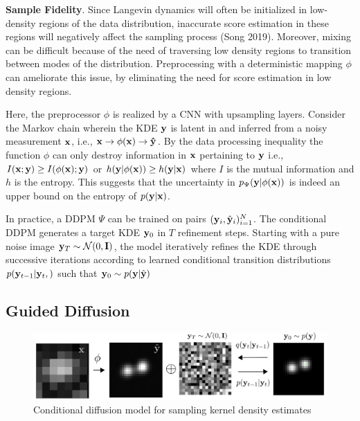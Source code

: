 \documentclass{article}
\begin{document}
\textbf{Sample Fidelity}. Since Langevin dynamics will often be initialized in low-density regions of the data distribution, inaccurate score estimation in these regions will negatively affect the sampling process (Song 2019). Moreover, mixing can be difficult because of the need of traversing low density regions to transition between modes of the distribution. Preprocessing with a deterministic mapping $\phi$ can ameliorate this issue, by eliminating the need for score estimation in low density regions. 

Here, the preprocessor $\phi$ is realized by a CNN with upsampling layers. Consider the Markov chain wherein the KDE $\bold{y}$ is latent in and inferred from a noisy measurement $\bold{x}$, i.e., $\bold{x} \rightarrow \phi(\bold{x})\rightarrow \bold{\hat{y}}$. By the data processing inequality the function $\phi$ can only destroy information in $\bold{x}$ pertaining to $\bold{y}$ i.e., $I(\bold{x};\bold{y}) \geq I(\phi(\bold{x});\bold{y})$ or $h(\bold{y}|\phi(\bold{x})) \geq h(\bold{y}|\bold{x})$ where $I$ is the mutual information and $h$ is the entropy. This suggests that the uncertainty in $p_{\Psi}(\bold{y}|\phi(\bold{x}))$ is indeed an upper bound on the entropy of $p(\bold{y}|\bold{x})$. 

In practice, a DDPM $\Psi$ can be trained on pairs $(\bold{y}_i,\hat{\bold{y}}_{i})_{i=1}^{N}$. The conditional DDPM generates a target KDE $\bold{y}_0$ in $T$ refinement steps. Starting with a pure noise image $\bold{y}_{T}\sim \mathcal{N}(0,\bold{I})$, the model iteratively refines the KDE through successive iterations according to learned conditional transition distributions $p(\bold{y}_{t-1}|\bold{y}_{t},\bold{})$ such that $\bold{y}_{0} \sim p(\bold{y}|\hat{\bold{y}})$ 

\subsection{Guided Diffusion}

\begin{figure}
\includegraphics[scale=4.5]{Denoise.png}
\caption{Conditional diffusion model for sampling kernel density estimates}
\end{figure}
\end{document}
